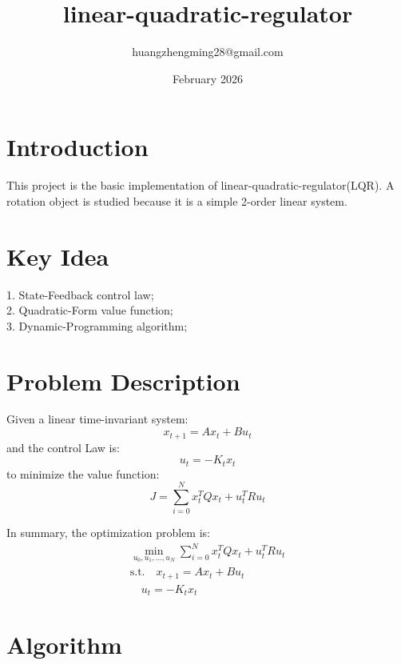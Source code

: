 \documentclass{article}
\title{linear-quadratic-regulator}
\author{huangzhengming28@gmail.com}
\date{February 2026}
\begin{document}
\maketitle

\section{Introduction}
This project is the basic implementation of linear-quadratic-regulator(LQR). A rotation object is studied because it is a simple 2-order linear system.

\section{Key Idea}
1. State-Feedback control law;\\
2. Quadratic-Form value function;\\
3. Dynamic-Programming algorithm;\\

\section{Problem Description}
Given a linear time-invariant system:
\begin{equation}
    x_{t+1} = A x_t + B u_t
\end{equation}
and the control Law is:
\begin{equation}
    u_t = -K_t x_t
\end{equation}
to minimize the value function:
\begin{equation}
    J = \sum_{i=0}^{N}{x_t^TQx_t+u_t^TRu_t}
\end{equation}

In summary, the optimization problem is:
\begin{gather}
    \min_{u_0, u_1, ..., u_N}{\sum_{i=0}^{N}{x_t^TQx_t+u_t^TRu_t}} \label{cost_function} \\
    \text{s.t.} \quad x_{t+1} = A x_t + B u_t \label{system_dynamics}\\
    \quad u_t = -K_t x_t \label{control_law}
\end{gather}

\section{Algorithm}
\end{document}
